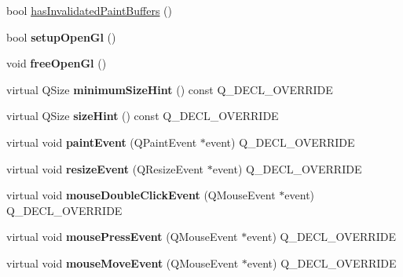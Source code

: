\begin{DoxyCompactItemize}
bool \hyperlink{class_q_custom_plot_ad452b582348c8e99462d83fe1cd0279b}{has\+Invalidated\+Paint\+Buffers} ()
\item 
\mbox{\label{class_q_custom_plot_a8954c4667c51070ff4e9b02d858fd190}} 
bool {\bfseries setup\+Open\+Gl} ()
\item 
\mbox{\label{class_q_custom_plot_aaa3073362074581a7b5905726b4a0067}} 
void {\bfseries free\+Open\+Gl} ()
\item 
\mbox{\label{class_q_custom_plot_a4be5390c093302178f9d1481cb5fe7a1}} 
virtual Q\+Size {\bfseries minimum\+Size\+Hint} () const Q\+\_\+\+D\+E\+C\+L\+\_\+\+O\+V\+E\+R\+R\+I\+DE
\item 
\mbox{\label{class_q_custom_plot_a54364e3e6c4022d92e4ea23bd0843cc6}} 
virtual Q\+Size {\bfseries size\+Hint} () const Q\+\_\+\+D\+E\+C\+L\+\_\+\+O\+V\+E\+R\+R\+I\+DE
\item 
\mbox{\label{class_q_custom_plot_acc43b1883cac1bdcd49e589991af4ccb}} 
virtual void {\bfseries paint\+Event} (Q\+Paint\+Event $\ast$event) Q\+\_\+\+D\+E\+C\+L\+\_\+\+O\+V\+E\+R\+R\+I\+DE
\item 
\mbox{\label{class_q_custom_plot_a0b69658ba8042a7e68238604c056d695}} 
virtual void {\bfseries resize\+Event} (Q\+Resize\+Event $\ast$event) Q\+\_\+\+D\+E\+C\+L\+\_\+\+O\+V\+E\+R\+R\+I\+DE
\item 
\mbox{\label{class_q_custom_plot_ad0be55c9ab8deb433e8f7522897d509e}} 
virtual void {\bfseries mouse\+Double\+Click\+Event} (Q\+Mouse\+Event $\ast$event) Q\+\_\+\+D\+E\+C\+L\+\_\+\+O\+V\+E\+R\+R\+I\+DE
\item 
\mbox{\label{class_q_custom_plot_a0fac62370735c4096d5cc57559420f4b}} 
virtual void {\bfseries mouse\+Press\+Event} (Q\+Mouse\+Event $\ast$event) Q\+\_\+\+D\+E\+C\+L\+\_\+\+O\+V\+E\+R\+R\+I\+DE
\item 
\mbox{\label{class_q_custom_plot_a01f74d8d344a6c6671550638345e7183}} 
virtual void {\bfseries mouse\+Move\+Event} (Q\+Mouse\+Event $\ast$event) Q\+\_\+\+D\+E\+C\+L\+\_\+\+O\+V\+E\+R\+R\+I\+DE

\end{DoxyCompactItemize}
